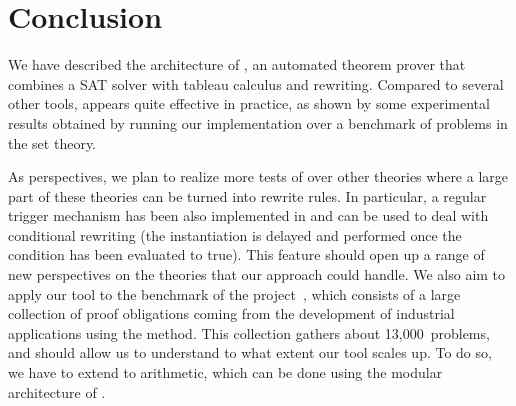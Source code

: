 
\section{Conclusion}

We have described the architecture of \archsat{}, an automated theorem prover
that combines a SAT solver with tableau calculus and rewriting. Compared to
several other tools, \archsat{} appears quite effective in practice, as shown by
some experimental results obtained by running our implementation over a
benchmark of problems in the \bmth{} set theory.

As perspectives, we plan to realize more tests of \archsat{} over other theories
where a large part of these theories can be turned into rewrite rules. In
particular, a regular trigger mechanism has been also implemented in \archsat{}
and can be used to deal with conditional rewriting (the instantiation is delayed
and performed once the condition has been evaluated to true). This feature
should open up a range of new perspectives on the theories that our approach
could handle. We also aim to apply our tool to the benchmark of the \bware{}
project~\cite{BWare}, which consists of a large collection of proof obligations
coming from the development of industrial applications using the \bmth{} method.
This collection gathers about 13,000~problems, and should allow us to understand
to what extent our tool scales up. To do so, we have to extend \archsat{} to
arithmetic, which can be done using the modular architecture of \archsat{}.
